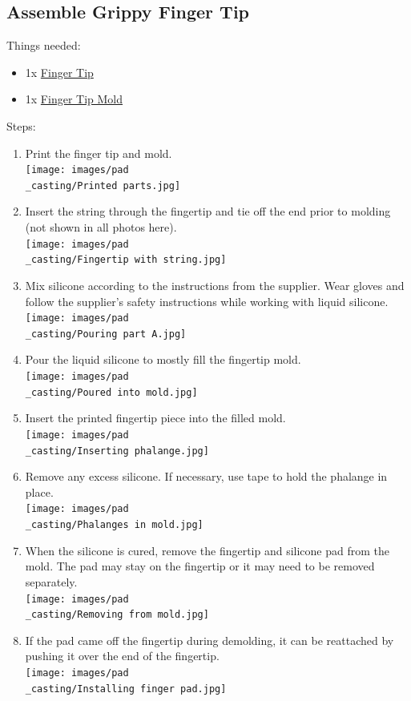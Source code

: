 \documentclass[11pt]{article}
\begin{document}
\subsection{Assemble Grippy Finger Tip}
Things needed:
\begin{itemize}
\item 1x \hyperlink{thing_finger\_tip}{Finger Tip}
\item 1x \hyperlink{thing_finger\_tip\_mold}{Finger Tip Mold}
\end{itemize}
Steps:
\begin{enumerate}
\item Print the finger tip and mold.\\ \texttt{[image: images/pad\\\_casting/Printed parts.jpg]}
\item Insert the string through the fingertip and tie off the end prior to molding (not shown in all photos here).\\ \texttt{[image: images/pad\\\_casting/Fingertip with string.jpg]}
\item Mix silicone according to the instructions from the supplier. Wear gloves and follow the supplier's safety instructions while working with liquid silicone.\\ \texttt{[image: images/pad\\\_casting/Pouring part A.jpg]}
\item Pour the liquid silicone to mostly fill the fingertip mold.\\ \texttt{[image: images/pad\\\_casting/Poured into mold.jpg]}
\item Insert the printed fingertip piece into the filled mold.\\ \texttt{[image: images/pad\\\_casting/Inserting phalange.jpg]}
\item Remove any excess silicone. If necessary, use tape to hold the phalange in place.\\ \texttt{[image: images/pad\\\_casting/Phalanges in mold.jpg]}
\item When the silicone is cured, remove the fingertip and silicone pad from the mold. The pad may stay on the fingertip or it may need to be removed separately.\\ \texttt{[image: images/pad\\\_casting/Removing from mold.jpg]}
\item If the pad came off the fingertip during demolding, it can be reattached by pushing it over the end of the fingertip.\\ \texttt{[image: images/pad\\\_casting/Installing finger pad.jpg]}

\end{enumerate}
\end{document}
